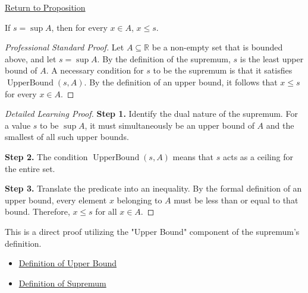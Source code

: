 \newpage
{}
\label{prf:every-element-lies-below-the-supremum}

\begin{remark*}[Return]
\hyperref[prop:every-element-lies-below-the-supremum]{Return to Proposition}
\end{remark*}

\begin{proposition*}
If $s = \sup A$, then for every $x \in A$, $x \le s$.
\end{proposition*}

\begin{proof}[Professional Standard Proof]
\LRAProofBodyStart
Let $A \subseteq \mathbb{R}$ be a non-empty set that is bounded above, and let $s = \sup A$. By the definition of the supremum, $s$ is the least upper bound of $A$. A necessary condition for $s$ to be the supremum is that it satisfies $\operatorname{UpperBound}(s, A)$. By the definition of an upper bound, it follows that $x \le s$ for every $x \in A$.
\end{proof}

\begin{proof}[Detailed Learning Proof]
\LRAProofBodyStart

\textbf{Step 1.} Identify the dual nature of the supremum. For a value $s$ to be $\sup A$, it must simultaneously be an upper bound of $A$ and the smallest of all such upper bounds.

\textbf{Step 2.} The condition $\operatorname{UpperBound}(s, A)$ means that $s$ acts as a ceiling for the entire set.

\textbf{Step 3.} Translate the predicate into an inequality. By the formal definition of an upper bound, every element $x$ belonging to $A$ must be less than or equal to that bound. Therefore, $x \le s$ for all $x \in A$.
\end{proof}

\begin{remark*}
This is a direct proof utilizing the "Upper Bound" component of the supremum's definition.
\end{remark*}

\begin{dependencies}
\begin{itemize}
  \item \hyperref[def:upper-bound]{Definition of Upper Bound}
  \item \hyperref[def:supremum]{Definition of Supremum}
\end{itemize}
\end{dependencies}

\clearpage
